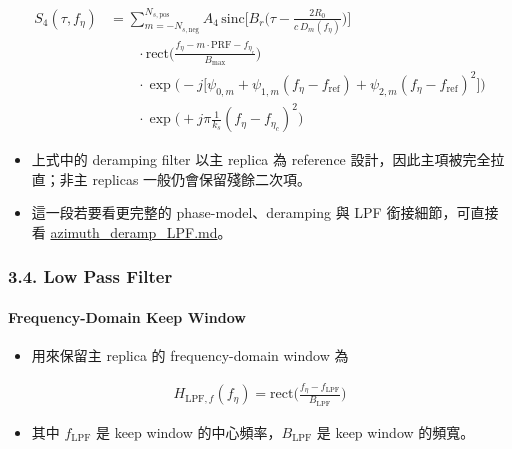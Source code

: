 \documentclass[11pt]{article}
\providecommand{\tightlist}{%
  \setlength{\itemsep}{0pt}\setlength{\parskip}{0pt}}
\begin{document}
\begin{equation}
\begin{aligned}
S_4(\tau,f_\eta)
&=
\sum_{m=-N_{s,\mathrm{neg}}}^{N_{s,\mathrm{pos}}} A_4\,
\mathrm{sinc}\biggl[ B_r\biggl( \tau-\frac{2R_0}{c\,D_m(f_\eta)} \biggr) \biggr]\\
&\qquad \cdot \mathrm{rect}\biggl( \frac{f_\eta-m\cdot\mathrm{PRF}-f_{\eta_c}}{B_{\max}} \biggr)\\
&\qquad \cdot \exp\biggl( -j\biggl[ \psi_{0,m}+\psi_{1,m}(f_\eta-f_{\mathrm{ref}})
+\psi_{2,m}(f_\eta-f_{\mathrm{ref}})^2 \biggr] \biggr)\\
&\qquad \cdot \exp\biggl( +j\pi\frac{1}{k_s}(f_\eta-f_{\eta_c})^2 \biggr)
\end{aligned}
\end{equation}

\begin{itemize}
\item
  上式中的 deramping filter 以主 replica 為 reference
  設計，因此主項被完全拉直；非主 replicas 一般仍會保留殘餘二次項。
\item
  這一段若要看更完整的 phase-model、deramping 與 LPF 銜接細節，可直接看
  \href{./azimuth_deramp_LPF.md}{azimuth\_deramp\_LPF.md}。
\end{itemize}

\hypertarget{low-pass-filter}{%
\subsubsection{3.4. Low Pass Filter}\label{low-pass-filter}}

\hypertarget{frequency-domain-keep-window}{%
\paragraph{Frequency-Domain Keep
Window}\label{frequency-domain-keep-window}}

\begin{itemize}
\tightlist
\item
  用來保留主 replica 的 frequency-domain window 為
\end{itemize}

\begin{equation}
\begin{aligned}
H_{\mathrm{LPF},f}(f_\eta)=\mathrm{rect}\biggl(\frac{f_\eta-f_{\mathrm{LPF}}}{B_{\mathrm{LPF}}}\biggr)
\end{aligned}
\end{equation}

\begin{itemize}
\tightlist
\item
  其中 \(f_{\mathrm{LPF}}\) 是 keep window
  的中心頻率，\(B_{\mathrm{LPF}}\) 是 keep window 的頻寬。
\end{itemize}
\end{document}
